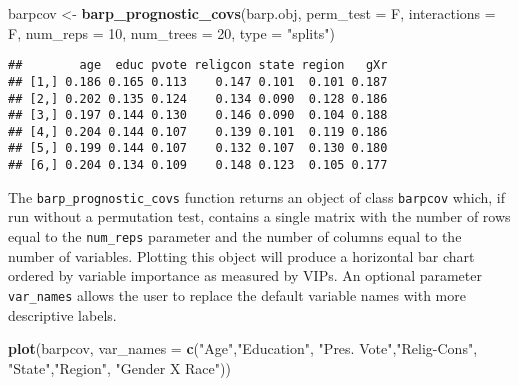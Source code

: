\documentclass[]{article}
\newenvironment{Shaded}{\begin{snugshade}}{\end{snugshade}}
\newcommand{\KeywordTok}[1]{\textcolor[rgb]{0.13,0.29,0.53}{\textbf{#1}}}
\newcommand{\DataTypeTok}[1]{\textcolor[rgb]{0.13,0.29,0.53}{#1}}
\newcommand{\DecValTok}[1]{\textcolor[rgb]{0.00,0.00,0.81}{#1}}
\newcommand{\StringTok}[1]{\textcolor[rgb]{0.31,0.60,0.02}{#1}}
\newcommand{\OperatorTok}[1]{\textcolor[rgb]{0.81,0.36,0.00}{\textbf{#1}}}
\newcommand{\NormalTok}[1]{#1}
\begin{document}
\begin{Shaded}
\begin{Highlighting}[]
\NormalTok{barpcov <-}\StringTok{ }\KeywordTok{barp_prognostic_covs}\NormalTok{(barp.obj,}
                                \DataTypeTok{perm_test =}\NormalTok{ F,}
                                \DataTypeTok{interactions =}\NormalTok{ F,}
                                \DataTypeTok{num_reps =} \DecValTok{10}\NormalTok{,}
                                \DataTypeTok{num_trees =} \DecValTok{20}\NormalTok{,}
                                \DataTypeTok{type =} \StringTok{"splits"}\NormalTok{)}
\end{Highlighting}
\end{Shaded}

\begin{Shaded}
\end{Shaded}

\begin{verbatim}
##        age  educ pvote religcon state region   gXr
## [1,] 0.186 0.165 0.113    0.147 0.101  0.101 0.187
## [2,] 0.202 0.135 0.124    0.134 0.090  0.128 0.186
## [3,] 0.197 0.144 0.130    0.146 0.090  0.104 0.188
## [4,] 0.204 0.144 0.107    0.139 0.101  0.119 0.186
## [5,] 0.199 0.144 0.107    0.132 0.107  0.130 0.180
## [6,] 0.204 0.134 0.109    0.148 0.123  0.105 0.177
\end{verbatim}

The \texttt{barp\_prognostic\_covs} function returns an object of class
\texttt{barpcov} which, if run without a permutation test, contains a
single matrix with the number of rows equal to the \texttt{num\_reps}
parameter and the number of columns equal to the number of variables.
Plotting this object will produce a horizontal bar chart ordered by
variable importance as measured by VIPs. An optional parameter
\texttt{var\_names} allows the user to replace the default variable
names with more descriptive labels.

\begin{Shaded}
\begin{Highlighting}[]
\KeywordTok{plot}\NormalTok{(barpcov,}
     \DataTypeTok{var_names =} \KeywordTok{c}\NormalTok{(}\StringTok{"Age"}\NormalTok{,}\StringTok{"Education"}\NormalTok{,}
                   \StringTok{"Pres. Vote"}\NormalTok{,}\StringTok{"Relig-Cons"}\NormalTok{,}
                   \StringTok{"State"}\NormalTok{,}\StringTok{"Region"}\NormalTok{,}
                   \StringTok{"Gender X Race"}\NormalTok{))}
\end{Highlighting}
\end{Shaded}
\end{document}
